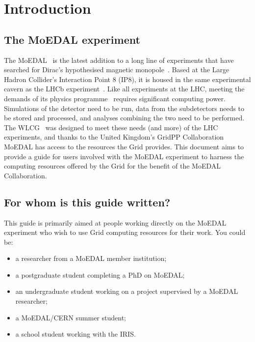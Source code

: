 \section{Introduction}
\label{sec:intro}
\subsection{The MoEDAL experiment}
\label{sec:intromoedal}
The \ac{MoEDAL}~\cite{MoEDAL2009}
is the latest addition to a long line of experiments that have searched for
Dirac's hypothesised magnetic monopole~\cite{Dirac1931}.
%
Based at the Large Hadron Collider's Interaction Point 8 (IP8),
it is housed in the same experimental cavern as
the \acs{LHCb} experiment~\cite{LHCb2008}.
%
Like all experiments at the \acs{LHC},
meeting the demands of its physics programme~\cite{MoEDAL2014}
requires significant computing power.
Simulations of the detector need to be run,
data from the subdetectors needs to be stored and processed,
and analyses combining the two need to be performed.
%
The \ac{WLCG}~\cite{WLCG2005} was
designed to meet these needs (and more) of the \ac{LHC}
experiments, and thanks to the
United Kingdom's GridPP Collaboration~\cite{gridpp2006,gridpp2009}
\ac{MoEDAL} has access to the resources the Grid provides.
%
This document aims to provide a guide for users involved
with the \ac{MoEDAL} experiment to harness the computing resources
offered by the Grid for the benefit of the
\ac{MoEDAL} Collaboration.

\subsection{For whom is this guide written?}
\label{sec:forwhom}
This guide is primarily aimed at people working directly on
the \ac{MoEDAL} experiment who wish to use Grid computing resources
for their work. You could be:

\begin{itemize}
\item a researcher from a \ac{MoEDAL} member institution;
\item a postgraduate student completing a PhD on \ac{MoEDAL};
\item an undergraduate student working on a project supervised by 
a \ac{MoEDAL} researcher;
\item a \ac{MoEDAL}/\acs{CERN} summer student;
\item a school student working with the \acf{IRIS}.
\end{itemize}

